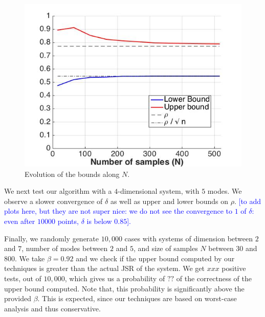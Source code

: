 \begin{figure}
\begin{center}
\includegraphics[scale=0.35]{bounds1.jpg}

\caption{Evolution of the bounds along $N$.}
\label{fig:21}
\end{center}
\end{figure}

We next test our algorithm with a $4$-dimensional system, with $5$ modes. We observe a slower convergence of $\delta$ as well as upper and lower bounds on $\rho$.
\textcolor{blue}{[to add plots here, but they are not super nice: we do not see the convergence to $1$ of $\delta$: even after $10 000$ points, $\delta$ is below $0.85$].}

Finally, we randomly generate $10,000$ cases with systems of dimension between $2$ and $7$, number of modes between $2$ and $5$, and size of samples $N$ between $30$ and $800$. We take $\beta = 0.92$ and we check if the upper bound computed by our techniques is greater than the actual JSR of the system. We get $xxx$ positive tests, out of $10,000$, which gives us a probability of $??$ of the correctness of the upper bound computed. Note that, this probability is significantly above the provided $\beta$. This is expected, since our techniques are based on worst-case analysis and thus conservative.



